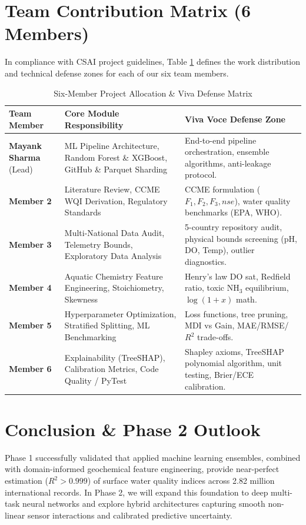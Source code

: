 \documentclass[conference]{IEEEtran}
\begin{document}
\section{Team Contribution Matrix (6 Members)}
In compliance with CSAI project guidelines, Table \ref{tab:team_contributions} defines the work distribution and technical defense zones for each of our six team members.

\begin{table}[htbp]
\caption{Six-Member Project Allocation \& Viva Defense Matrix}
\label{tab:team_contributions}
\centering
\begin{tabular}{p{1.8cm}p{2.8cm}p{3.2cm}}
\toprule
\textbf{Team Member} & \textbf{Core Module Responsibility} & \textbf{Viva Voce Defense Zone} \\
\midrule
\textbf{Mayank Sharma} (Lead) & ML Pipeline Architecture, Random Forest \& XGBoost, GitHub \& Parquet Sharding & End-to-end pipeline orchestration, ensemble algorithms, anti-leakage protocol. \\
\midrule
\textbf{Member 2} & Literature Review, CCME WQI Derivation, Regulatory Standards & CCME formulation ($F_1, F_2, F_3, nse$), water quality benchmarks (EPA, WHO). \\
\midrule
\textbf{Member 3} & Multi-National Data Audit, Telemetry Bounds, Exploratory Data Analysis & 5-country repository audit, physical bounds screening (pH, DO, Temp), outlier diagnostics. \\
\midrule
\textbf{Member 4} & Aquatic Chemistry Feature Engineering, Stoichiometry, Skewness & Henry's law DO sat, Redfield ratio, toxic $\text{NH}_3$ equilibrium, $\log(1+x)$ math. \\
\midrule
\textbf{Member 5} & Hyperparameter Optimization, Stratified Splitting, ML Benchmarking & Loss functions, tree pruning, MDI vs Gain, MAE/RMSE/$R^2$ trade-offs. \\
\midrule
\textbf{Member 6} & Explainability (TreeSHAP), Calibration Metrics, Code Quality / PyTest & Shapley axioms, TreeSHAP polynomial algorithm, unit testing, Brier/ECE calibration. \\
\bottomrule
\end{tabular}
\end{table}

\section{Conclusion \& Phase 2 Outlook}
Phase 1 successfully validated that applied machine learning ensembles, combined with domain-informed geochemical feature engineering, provide near-perfect estimation ($R^2 > 0.999$) of surface water quality indices across 2.82 million international records. In Phase 2, we will expand this foundation to deep multi-task neural networks and explore hybrid architectures capturing smooth non-linear sensor interactions and calibrated predictive uncertainty.



\end{document}
